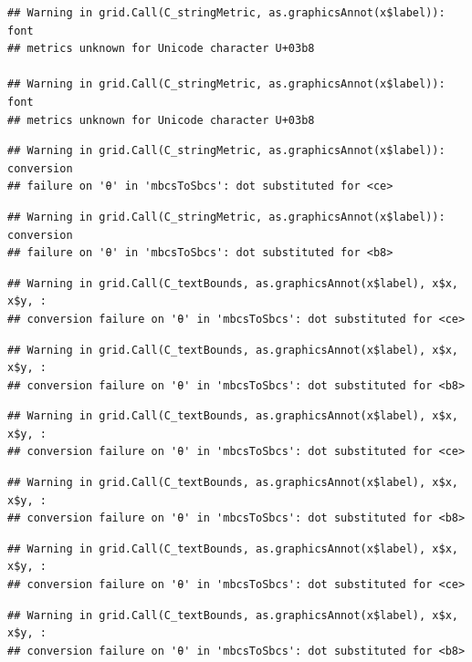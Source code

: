\documentclass[]{book}
\theoremstyle{definition}
\theoremstyle{definition}
\theoremstyle{definition}
\theoremstyle{remark}
\begin{document}
\begin{verbatim}
## Warning in grid.Call(C_stringMetric, as.graphicsAnnot(x$label)): font
## metrics unknown for Unicode character U+03b8

## Warning in grid.Call(C_stringMetric, as.graphicsAnnot(x$label)): font
## metrics unknown for Unicode character U+03b8
\end{verbatim}

\begin{verbatim}
## Warning in grid.Call(C_stringMetric, as.graphicsAnnot(x$label)): conversion
## failure on 'θ' in 'mbcsToSbcs': dot substituted for <ce>
\end{verbatim}

\begin{verbatim}
## Warning in grid.Call(C_stringMetric, as.graphicsAnnot(x$label)): conversion
## failure on 'θ' in 'mbcsToSbcs': dot substituted for <b8>
\end{verbatim}

\begin{verbatim}
## Warning in grid.Call(C_textBounds, as.graphicsAnnot(x$label), x$x, x$y, :
## conversion failure on 'θ' in 'mbcsToSbcs': dot substituted for <ce>
\end{verbatim}

\begin{verbatim}
## Warning in grid.Call(C_textBounds, as.graphicsAnnot(x$label), x$x, x$y, :
## conversion failure on 'θ' in 'mbcsToSbcs': dot substituted for <b8>
\end{verbatim}

\begin{verbatim}
## Warning in grid.Call(C_textBounds, as.graphicsAnnot(x$label), x$x, x$y, :
## conversion failure on 'θ' in 'mbcsToSbcs': dot substituted for <ce>
\end{verbatim}

\begin{verbatim}
## Warning in grid.Call(C_textBounds, as.graphicsAnnot(x$label), x$x, x$y, :
## conversion failure on 'θ' in 'mbcsToSbcs': dot substituted for <b8>
\end{verbatim}

\begin{verbatim}
## Warning in grid.Call(C_textBounds, as.graphicsAnnot(x$label), x$x, x$y, :
## conversion failure on 'θ' in 'mbcsToSbcs': dot substituted for <ce>
\end{verbatim}

\begin{verbatim}
## Warning in grid.Call(C_textBounds, as.graphicsAnnot(x$label), x$x, x$y, :
## conversion failure on 'θ' in 'mbcsToSbcs': dot substituted for <b8>
\end{verbatim}
\end{document}
